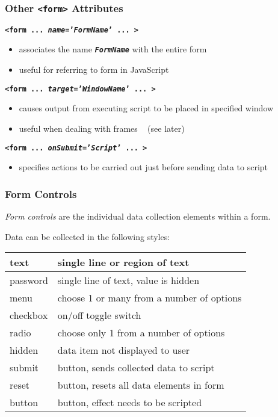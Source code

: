 \begin{frame}
\frametitle{Other \textbf{\tt{{\textless}form>}} Attributes}
\textbf{\tt{{\textless}form ... {\em{{\bf{name}}}}='{\it{FormName}}' ... >}}
\begin{itemize}
\item  associates the name \textbf{\tt{{\it{FormName}}}} with the entire form
\item  useful for referring to form in JavaScript
\end{itemize}
\textbf{\tt{{\textless}form ... {\em{{\bf{target}}}}='{\it{WindowName}}' ... >}}
\begin{itemize}
\item  causes output from executing script to be placed in specified window
\item  useful when dealing with frames ~ {\small (see later)}
\end{itemize}
\textbf{\tt{{\textless}form ... {\em{{\bf{onSubmit}}}}='{\it{Script}}' ... >}}
\begin{itemize}
\item  specifies actions to be carried out just before sending data to script
\end{itemize}
\end{frame}

\begin{frame}
\frametitle{Form Controls}
{\em{Form controls}} are the individual data collection elements within a form.

Data can be collected in the following styles:
\begin{center}


\begin{center}\begin{tabular}{|l|l|}
\hline
 text  &  single line or region of text \\ \hline
 password  &  single line of text, value is hidden \\ \hline
 menu  &  choose 1 or many from a number of options \\ \hline
 checkbox  &  on/off toggle switch \\ \hline
 radio  &  choose only 1 from a number of options \\ \hline
 hidden  &  data item not displayed to user \\ \hline
 submit  &  button, sends collected data to script \\ \hline
 reset  &  button, resets all data elements in form \\ \hline
 button  &  button, effect needs to be scripted \\ \hline
\end{tabular}
\end{center}

\end{center}
\end{frame}


